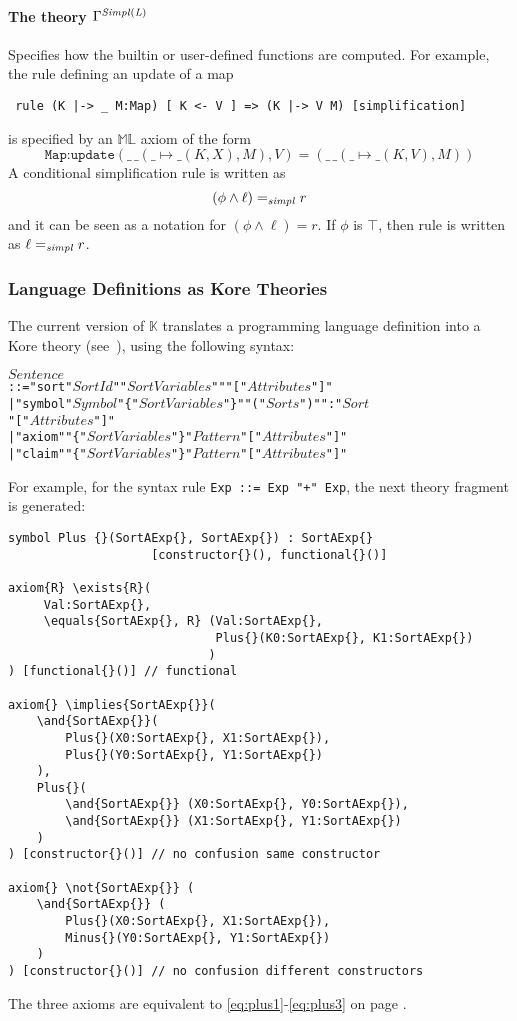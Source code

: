 \documentclass{article}
\theoremstyle{plain}
\theoremstyle{definition}
\newcommand{\K}{$\mathbb{K}$\xspace}
\newcommand{\ML}{$\mathbb{ML}$\xspace}
\newcommand{\Sort}{\mathit{Sort}}
\newcommand{\Sorts}{\ensuremath{\mathit{Sorts}}}
\newcommand{\SortVariables}{\ensuremath{\mathit{SortVariables}}}
\newcommand{\SortId}{\ensuremath{\mathit{SortId}}}
\newcommand{\SymbolId}{\ensuremath{\mathit{Symbol}}}
\newcommand{\PatternIt}{\ensuremath{\mathit{Pattern}}}
\newcommand{\Sentence}{\ensuremath{\mathit{Sentence}}}
\newcommand{\Attributes}{\ensuremath{\mathit{Attributes}}}
\begin{document}
\paragraph{The theory $\Gamma^{\it Simpl(L)}$\\} Specifies how the builtin or user-defined functions are computed. 
For example, the rule defining an update of a map
\begin{verbatim}
 rule (K |-> _ M:Map) [ K <- V ] => (K |-> V M) [simplification]
\end{verbatim}
is specified by an \ML axiom of the form
\[
\texttt{Map:update}(\_\,\_(\_{\mapsto}\_(K, X), M), V) = (\_\,\_(\_{\mapsto}\_(K, V), M))
\]
A conditional simplification rule is written as
\[
(\phi \land \ell) =_{\it simpl} r
\]
and it can be seen as a notation for $(\phi \land \ell) = r$. If $\phi$ is $\top$, then rule is written as 
$\ell =_{\it simpl} r$.

\subsubsection{Language Definitions as Kore Theories}
\label{sec:kore-definition}

The current version of \K translates a programming language definition into a Kore theory (see~), using the following syntax:
\begin{alltt}
  \(\Sentence\)
    ::= "sort" \(\SortId\) "{" \(\SortVariables\) "}" "[" \(\Attributes\) "]"
      | "symbol" \(\SymbolId\) "\{" \(\SortVariables\) "\}" "(" \(\Sorts\) ")" ":" \(\Sort\) 
                                                 "[" \(\Attributes\) "]"
      | "axiom" "\{" \(\SortVariables\) "\}" \(\PatternIt\) "[" \(\Attributes\) "]"
      | "claim" "\{" \(\SortVariables\) "\}" \(\PatternIt\) "[" \(\Attributes\) "]" 
\end{alltt}
For example, for the syntax rule \verb|Exp ::= Exp "+" Exp|, the next theory fragment is generated:
\begin{verbatim}
symbol Plus {}(SortAExp{}, SortAExp{}) : SortAExp{} 
                    [constructor{}(), functional{}()]

axiom{R} \exists{R}(
     Val:SortAExp{}, 
     \equals{SortAExp{}, R} (Val:SortAExp{}, 
                             Plus{}(K0:SortAExp{}, K1:SortAExp{})
                            )
) [functional{}()] // functional

axiom{} \implies{SortAExp{}}( 
    \and{SortAExp{}}(
        Plus{}(X0:SortAExp{}, X1:SortAExp{}), 
        Plus{}(Y0:SortAExp{}, Y1:SortAExp{})
    ), 
    Plus{}(
        \and{SortAExp{}} (X0:SortAExp{}, Y0:SortAExp{}), 
        \and{SortAExp{}} (X1:SortAExp{}, Y1:SortAExp{})
    )
) [constructor{}()] // no confusion same constructor

axiom{} \not{SortAExp{}} (
    \and{SortAExp{}} (
        Plus{}(X0:SortAExp{}, X1:SortAExp{}), 
        Minus{}(Y0:SortAExp{}, Y1:SortAExp{})
    )
) [constructor{}()] // no confusion different constructors
\end{verbatim}
The three axioms are equivalent to \eqref{eq:plus1}-\eqref{eq:plus3} on page \pageref{eq:plus1}.
\end{document}
